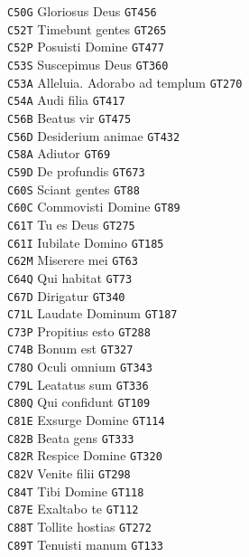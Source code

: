 \documentclass[a4paper]{article}
\begin{document}
{\begin{multicols}{2}
\texttt{C50G} Gloriosus Deus \texttt{GT456}\\
\texttt{C52T} Timebunt gentes \texttt{GT265}\\
\texttt{C52P} Posuisti Domine \texttt{GT477}\\
\texttt{C53S} Suscepimus Deus \texttt{GT360}\\
\texttt{C53A} Alleluia. Adorabo ad templum \texttt{GT270}\\
\texttt{C54A} Audi filia \texttt{GT417}\\
\texttt{C56B} Beatus vir \texttt{GT475}\\
\texttt{C56D} Desiderium animae \texttt{GT432}\\
\texttt{C58A} Adiutor \texttt{GT69}\\
\texttt{C59D} De profundis \texttt{GT673}\\
\texttt{C60S} Sciant gentes \texttt{GT88}\\
\texttt{C60C} Commovisti Domine \texttt{GT89}\\
\texttt{C61T} Tu es Deus \texttt{GT275}\\
\texttt{C61I} Iubilate Domino \texttt{GT185}\\
\texttt{C62M} Miserere mei \texttt{GT63}\\
\texttt{C64Q} Qui habitat \texttt{GT73}\\
\texttt{C67D} Dirigatur \texttt{GT340}\\
\texttt{C71L} Laudate Dominum \texttt{GT187}\\
\texttt{C73P} Propitius esto \texttt{GT288}\\
\texttt{C74B} Bonum est \texttt{GT327}\\
\texttt{C78O} Oculi omnium \texttt{GT343}\\
\texttt{C79L} Leatatus sum \texttt{GT336}\\
\texttt{C80Q} Qui confidunt \texttt{GT109}\\
\texttt{C81E} Exsurge Domine \texttt{GT114}\\
\texttt{C82B} Beata gens \texttt{GT333}\\
\texttt{C82R} Respice Domine \texttt{GT320}\\
\texttt{C82V} Venite filii \texttt{GT298}\\
\texttt{C84T} Tibi Domine \texttt{GT118}\\
\texttt{C87E} Exaltabo te \texttt{GT112}\\
\texttt{C88T} Tollite hostias \texttt{GT272}\\
\texttt{C89T} Tenuisti manum \texttt{GT133}\\

\end{multicols}}
\end{document}
